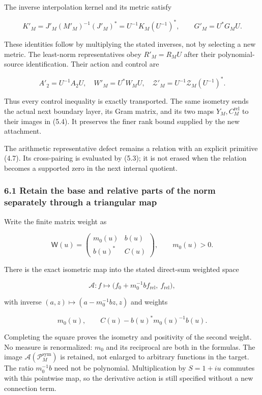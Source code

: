 The inverse interpolation kernel and its metric satisfy

\[K'_M=J'_M(M'_M)^{-1}(J'_M)^*=U^{-1}K_M(U^{-1})^*,\qquad
G'_M=U^*G_MU.\tag{6.2}\]

These identities follow by multiplying the stated inverses, not by
selecting a new metric. The least-norm representatives obey
\(R'_M=R_MU\) after their polynomial-source identification. Their action
and control are

\[A'_2=U^{-1}A_2U,\quad W'_M=U^*W_MU,\quad
\mathcal Z'_M=U^{-1}\mathcal Z_M(U^{-1})^*.\tag{6.3}\]

Thus every control inequality is exactly transported. The same isometry
sends the actual next boundary layer, its Gram matrix, and its two maps
\(Y_M,C_M^{\mathrm{rel}}\) to their images in (5.4). It preserves the
finer rank bound supplied by the new attachment.

The arithmetic representative defect remains a relation with an explicit
primitive (4.7). Its cross-pairing is evaluated by (5.3); it is not
erased when the relation becomes a supported zero in the next internal
quotient.

\subsubsection{6.1 Retain the base and relative parts of the norm
separately through a triangular
map}\label{spectral_sum_full:retain-the-base-and-relative-parts-of-the-norm-separately-through-a-triangular-map}

Write the finite matrix weight as

\[\mathsf W(u)=\begin{pmatrix}m_0(u)&b(u)\\b(u)^*&C(u)\end{pmatrix},\qquad m_0(u)>0.\]

There is the exact isometric map into the stated direct-sum weighted
space

\[\mathcal A:f\longmapsto\bigl(f_0+m_0^{-1}b f_{\mathrm{rel}},\ f_{\mathrm{rel}}\bigr),\tag{6.4}\]

with inverse \((a,z)\mapsto(a-m_0^{-1}bz,z)\) and weights

\[m_0(u),\qquad C(u)-b(u)^*m_0(u)^{-1}b(u).\tag{6.5}\]

Completing the square proves the isometry and positivity of the second
weight. No measure is renormalized: \(m_0\) and its reciprocal are both
in the formulas. The image \(\mathcal A(\mathcal P_M^{\mathrm{sym}})\)
is retained, not enlarged to arbitrary functions in the target. The
ratio \(m_0^{-1}b\) need not be polynomial. Multiplication by \(S=1+iu\)
commutes with this pointwise map, so the derivative action is still
specified without a new connection term.

